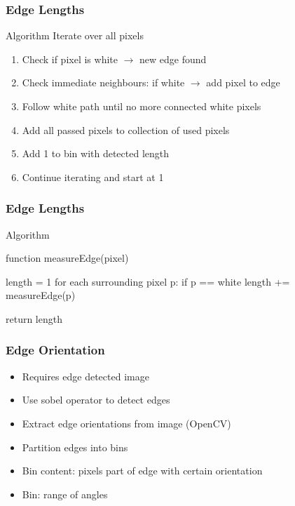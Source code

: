 \documentclass{beamer}
\begin{document}
\begin{frame}
	\frametitle{Edge Lengths}
	\begin{block}{Algorithm}
		Iterate over all pixels
		\begin{enumerate}
			\item Check if pixel is white $\rightarrow$ new edge found
			\item Check immediate neighbours: if white $\rightarrow$ add pixel to edge
			\item Follow white path until no more connected white pixels
			\item Add all passed pixels to collection of used pixels
			\item Add 1 to bin with detected length
			\item Continue iterating and start at 1
			
		\end{enumerate}
	\end{block}
\end{frame}


\begin{frame}[fragile]
	\frametitle{Edge Lengths}
	\begin{block}{Algorithm}
		\begin{verbatimtab}[4]
function measureEdge(pixel) {
	length = 1
	for each surrounding pixel p:
		if p == white
			length += measureEdge(p)
	
	return length
}
		\end{verbatimtab}
	\end{block}
\end{frame}

\begin{frame}
	\frametitle{Edge Orientation}
	\begin{itemize}
		\item Requires edge detected image
		\item Use sobel operator to detect edges
		\item Extract edge orientations from image (OpenCV)
		\item Partition edges into bins
		\item Bin content: pixels part of edge with certain orientation
		\item Bin: range of angles
	\end{itemize}
	
	
\end{frame}
\end{document}
